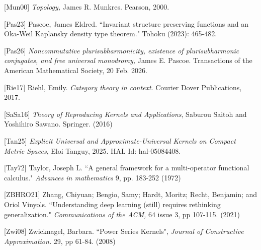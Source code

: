 \documentclass[12pt]{amsart}
\theoremstyle{definition}
\numberwithin{equation}{section}
\begin{document}
[Mun00] \textit{Topology,} James R. Munkres. Pearson, 2000. 

[Pas23] Pascoe, James Eldred. ``Invariant structure preserving functions and an Oka-Weil Kaplansky density type theorem." Tohoku (2023): 465-482.

[Pas26] \textit{Noncommutative plurisubharmonicity, existence of plurisubharmonic conjugates, and free universal monodromy,} James E. Pascoe. Transactions of the American Mathematical Society, 20 Feb. 2026. 

[Rie17] Riehl, Emily. \textit{Category theory in context}. Courier Dover Publications, 2017.

[SaSa16] \textit{Theory of Reproducing Kernels and Applications}, Saburou Saitoh and Yoshihiro Sawano. Springer. (2016)

[Tan25] \textit{Explicit Universal and Approximate-Universal Kernels on Compact Metric Spaces}, Eloi Tanguy, 2025. HAL Id: hal-05084408.

[Tay72] Taylor, Joseph L. ``A general framework for a multi-operator functional calculus." \textit{Advances in mathematics} 9, pp. 183-252 (1972)

[ZBHRO21] Zhang, Chiyuan; Bengio, Samy; Hardt, Moritz; Recht, Benjamin; and Oriol Vinyols. ``Understanding deep learning (still) requires rethinking generalization." \textit{Communications of the ACM,} 64 issue 3, pp 107-115. (2021)

[Zwi08] Zwicknagel, Barbara. ``Power Series Kernels", \textit{Journal of Constructive Approximation.} 29, pp 61-84. (2008)
\end{document}
